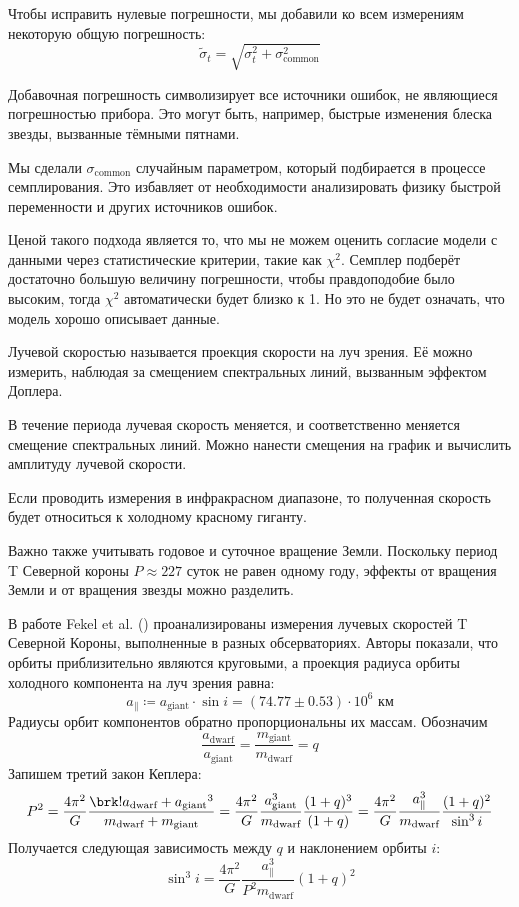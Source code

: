Чтобы исправить нулевые погрешности, мы добавили ко всем измерениям некоторую общую погрешность:
\[
\tilde \sigma_t = \sqrt{\sigma_t^2 + \sigma_\text{common}^2}
\]

Добавочная погрешность символизирует все источники ошибок, не являющиеся погрешностью прибора. Это могут быть, например, быстрые изменения блеска звезды, вызванные тёмными пятнами.

Мы сделали $\sigma_\text{common}$ случайным параметром, который подбирается в процессе семплирования. Это избавляет от необходимости анализировать физику быстрой переменности и других источников ошибок.

Ценой такого подхода является то, что мы не можем оценить согласие модели с данными через статистические критерии, такие как $\chi^2$. Семплер подберёт достаточно большую величину погрешности, чтобы правдоподобие было высоким, тогда $\chi^2$ автоматически будет близко к 1. Но это не будет означать, что модель хорошо описывает данные.



Лучевой скоростью называется проекция скорости на луч зрения. Её можно измерить, наблюдая за смещением спектральных линий, вызванным эффектом Доплера.

В течение периода лучевая скорость меняется, и соответственно меняется смещение спектральных линий. Можно нанести смещения на график и вычислить амплитуду лучевой скорости.


Если проводить измерения в инфракрасном диапазоне, то полученная скорость будет относиться к холодному красному гиганту.

Важно также учитывать годовое и суточное вращение Земли. Поскольку период T Северной короны $P \approx 227$ суток не равен одному году, эффекты от вращения Земли и от вращения звезды можно разделить.



В работе Fekel et al. (\citeyear{RadialVelocities}) проанализированы измерения лучевых скоростей T Северной Короны, выполненные в разных обсерваториях. Авторы показали, что орбиты приблизительно являются круговыми, а проекция радиуса орбиты холодного компонента на луч зрения равна:
\[
a_\| \coloneq a_\text{giant} \cdot \sin i = (74.77 \pm 0.53) \cdot 10^6 \text{ км}
\]
%
%
Радиусы орбит компонентов обратно пропорциональны их массам. Обозначим
\[
\frac{a_\text{dwarf}}{a_\text{giant}} = \frac{m_\text{giant}}{m_\text{dwarf}} = q
\]
Запишем третий закон Кеплера:
\[
P^2 = \frac{4\pi^2}{G} \frac{\brk!{a_\text{dwarf} + a_\text{giant}}^3}{m_\text{dwarf} + m_\text{giant}}
= \frac{4\pi^2}{G} \frac{a_\text{giant}^3}{m_\text{dwarf}} \frac{(1 + q)^3}{(1 + q)}
= \frac{4\pi^2}{G} \frac{a_\|^3}{m_\text{dwarf}} \frac{(1 + q)^2}{\sin^3 i}
\]
Получается следующая зависимость между $q$ и наклонением орбиты $i$:
\[
\sin^3 i = \frac{4\pi^2}{G} \frac{a_\|^3}{P^2 m_\text{dwarf}} (1 + q)^2
\]

